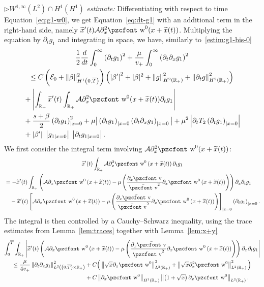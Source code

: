 \documentclass[10pt]{amsart}
\theoremstyle{definition}\newtheorem{defi}[theo]{Definition}\newtheorem{rema}[theo]{Remark}\newtheorem{exam}[theo]{Example}\newtheorem{exem}[theo]{Example}\newtheorem{nota}[theo]{Notation}
\newcommand{\mathpzc}[1]{\text{\pzcfont #1}}
\newcommand{\R}{\mathbb{R}}
\newcommand{\p}{\partial}
\newcommand{\bv}{\bar{\mathpzc{v}}}
\newcommand{\cA}{\mathcal A}
\newcommand{\cE}{\mathcal E}
\newcommand{\tw}{\mathpzc{w}}
\newcommand{\tx}{\widetilde{x}}
\begin{document}
$\rhd W^{1,\infty}(L^2)\cap H^1(H^1)$ \emph{estimate:} Differentiating with respect to time Equation~\eqref{eq:g1-w0}, we get Equation~\eqref{eq:dt-g1} with an additional term in the right-hand side, namely $\tx'(t)\cA \partial^2_x \tw^0(x+\tx(t))$. Multiplying the equation by $\partial_t g_1$ and integrating in space, we have, similarly to~\eqref{estim:g1-bis-0}
\begin{multline}\label{estim:dt-g1-bis-0}
 \frac{1}{2}\frac{d}{dt}\int_0^\infty \left(\p_t g_1\right)^2 + \frac{\mu}{v_+}\int_0^\infty \left(\p_t \p_x g_1\right)^2  \\
 \leq C\left(\cE_0 + \|\beta\|_{H^1\left(0, \overline{T}\right)}^2\right)\left(\left|\beta'\right|^2 + |\beta|^2+ \left\| g \right\|_{H^2(\R_+)}^2 + \left\| \p_t g\right\|_{H^2(\R_+)}^2\right)
\\
\begin{aligned}
&  + \left|\int_{\R_+} \tx'(t)\int_{\R_+}\cA \partial^2_x \tw^0(x+\tx(t)) \partial_t g_1 \right|\\
& + \dfrac{s+ \beta}{2} \left(\p_t g_1\right)_{|x=0}^2 + \mu \big|\left(\p_t g_1\right)_{|x=0}\left(\p_t \partial_x g_1\right)_{|x=0} \big| +\mu^2 \left|\p_t T_2 \left(\p_t g_1\right)_{|x=0} \right|
\\
&+ \left|\beta'\right| \; \left|g_{1|x=0}\right| \; \left|\p_t g_{1|x=0}\right|.
\end{aligned}
\end{multline}
We first consider the integral term involving $\cA \partial^2_x \tw^0(x+\tx(t))$:
\begin{multline*}
\tx'(t)\int_{\R_+}\cA \partial^2_x \tw^0\left(x+\tx(t)\right) \partial_t g_1 \\
\begin{aligned}
& = - \tx'(t) \int_{\R_+} \left(\cA \partial_x \tw^0\left(x+ \tx(t)\right) - \mu \left(\frac{\partial_x \bv}{\bv^2}\partial_x \tw^0\left(x+\tx(t)\right)\right) \right) \partial_x \partial_t g_1 \\
& \quad -\tx'(t) \left[\cA \partial_x \tw^0\left(x+ \tx(t)\right) - \mu \left(\frac{\partial_x \bv}{\bv^2}\partial_x \tw^0\left(x+\tx(t)\right)\right)\right]_{|x=0}\left(\partial_t g_1\right)_{|x=0}.
\end{aligned}
\end{multline*}
The integral is then controlled by a Cauchy--Schwarz inequality, using the trace estimates from Lemma~\ref{lem:traces} together with Lemma~\ref{lem:x+y}
\begin{multline*}
\int_0^{\overline{T}}\int_{\R_+} \left|\tx'(t) \left(\cA \partial_x \tw^0\left(x+ \tx(t)\right) - \mu \left(\frac{\partial_x \bv}{\bv^2}\partial_x \tw^0\left(x+\tx(t)\right)\right) \right) \partial_x \partial_t g_1 \right| \\
\begin{aligned}
\leq \frac{\mu}{4v_+} \left\|\partial_t \partial_x g_1\right\|_{L^2\left(\left(0,\overline{T}\right)\times \R_+\right)}^2 &+ C \Big(\left\|\sqrt{x} \partial_x \tw^0\right\|_{L^2(\R_+)}^2 + \left\|\sqrt{x} \partial^2_x \tw^0\right\|_{L^2(\R_+)}^2 \Big)\\
 &+ C\left\|\p_x \tw^0\right\|_{H^1(\R_+)} \left\|\left(1+\sqrt{x}\right)\p_x \tw^0\right\|_{L^2(\R_+)}.
\end{aligned}
\end{multline*}
\end{document}
